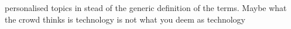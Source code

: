 personalised topics in stead of the generic definition of the terms. Maybe what the crowd thinks is technology is not what you deem as technology

%
%
%
%
